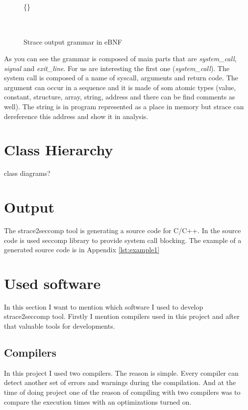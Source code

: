 \begin{figure}[h]
	\label{strace_grammar_simple}
	\begin{bnf*}
		{ \bnfor {} \bnfor {}}\\
		{ \bnfsp  {} \bnfsp \{\} \bnfsp {} \bnfsp {} \bnfsp {}}\\
			{ \bnfsp {} \bnfsp {}}\\
		{ \bnfsp {} \bnfsp {}}\\
	\end{bnf*}
	\caption{Strace output grammar in eBNF}
\end{figure}

As you can see the grammar is composed of main parts that are \emph{system\_call}, \emph{signal} and \emph{exit\_line}.
For us are interesting the first one (\emph{system\_call}).
The system call is composed of a name of syscall, arguments and return code.
The argument can occur in a sequence and it is made of som atomic types
(value, constant, structure, array, string, address and there can be find comments as  well).
The string is in program represented as a place in memory but strace can dereference this address
and show it in analysis.

\section{Class Hierarchy}
class diagrams?

\section{Output}
The strace2seccomp tool is generating a source code for C/C++.
In the source code is used seccomp library to provide system call blocking.
The example of a generated source code is in Appendix \ref{lst:example1}
\section{Used software}
In this section I want to mention which software I used to develop strace2seccomp tool.
Firstly I mention compilers used in this project and after that valuable tools for developments.

\subsection{Compilers}
\label{subsec:compilers}
In this project I used two compilers. The reason is simple.
Every compiler can detect another set of errors and warnings during the compilation.
And at the time of doing project one of the reason of compiling with two compilers
was to compare the execution times with an optimizations turned on.

